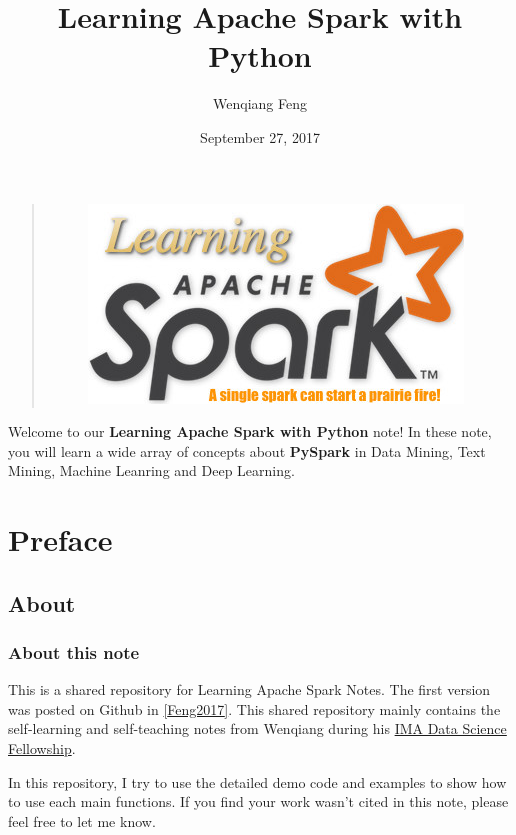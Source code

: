 \documentclass[letterpaper,11pt,english]{sphinxmanual}
\title{Learning Apache Spark with Python}
\date{September 27, 2017}
\author{Wenqiang Feng}
\begin{document}
\maketitle
\tableofcontents
{}\label{index::doc}\label{index:index}\begin{quote}
\begin{figure}[htbp]
\centering

\includegraphics{logo.jpg}
\label{index:fig-logo}\end{figure}
\end{quote}

Welcome to our \textbf{Learning Apache Spark with Python} note!
In these note, you will learn a wide array of concepts about
\textbf{PySpark} in Data Mining, Text Mining, Machine Leanring
and Deep Learning.




\chapter{Preface}
\label{preface:id1}\label{preface::doc}\label{preface:contents}\label{preface:preface}

\section{About}
\label{preface:about}

\subsection{About this note}
\label{preface:about-this-note}
This is a shared repository for Learning Apache Spark Notes.
The first version was posted on Github in {\hyperref[reference:feng2017]{{[}Feng2017{]}}}.
This shared repository mainly contains the self-learning and
self-teaching notes from Wenqiang during his \href{https://www.ima.umn.edu/2016-2017/SW1.23-3.10.17\#}{IMA Data Science
Fellowship}.

In this repository, I try to use the detailed demo code and
examples to show how to use each main functions. If you find
your work wasn’t cited in this note, please feel free to let
me know.
\end{document}
